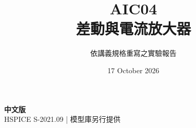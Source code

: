 \documentclass[11pt,a4paper]{article}
\title{\color{accent}AIC04\\[4pt]差動與電流放大器}
\author{依講義規格重寫之實驗報告}
\date{17 October 2026}
\begin{document}
\maketitle
\begin{center}\small\textbf{中文版}\\
HSPICE S-2021.09 \quad | \quad 模型庫另行提供
\end{center}


\end{document}
